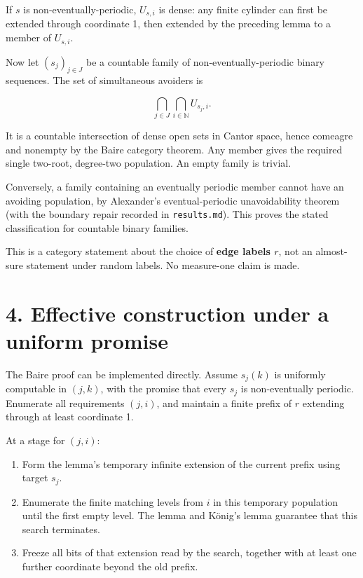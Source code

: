 \documentclass[
  11pt,
]{article}
\providecommand{\tightlist}{%
  \setlength{\itemsep}{0pt}\setlength{\parskip}{0pt}}
\begin{document}
If \(s\) is non-eventually-periodic, \(U_{s,i}\) is dense: any finite
cylinder can first be extended through coordinate 1, then extended by
the preceding lemma to a member of \(U_{s,i}\).

Now let \((s_j)_{j\in J}\) be a countable family of
non-eventually-periodic binary sequences. The set of simultaneous
avoiders is

\[\bigcap_{j\in J}\bigcap_{i\in\mathbb N}U_{s_j,i}.\]

It is a countable intersection of dense open sets in Cantor space, hence
comeagre and nonempty by the Baire category theorem. Any member gives
the required single two-root, degree-two population. An empty family is
trivial.

Conversely, a family containing an eventually periodic member cannot
have an avoiding population, by Alexander's eventual-periodic
unavoidability theorem (with the boundary repair recorded in
\texttt{results.md}). This proves the stated classification for
countable binary families.

This is a category statement about the choice of \textbf{edge labels
\(r\)}, not an almost-sure statement under random labels. No measure-one
claim is made.

\section{4. Effective construction under a uniform
promise}\label{effective-construction-under-a-uniform-promise}

The Baire proof can be implemented directly. Assume \(s_j(k)\) is
uniformly computable in \((j,k)\), with the promise that every \(s_j\)
is non-eventually periodic. Enumerate all requirements \((j,i)\), and
maintain a finite prefix of \(r\) extending through at least coordinate
1.

At a stage for \((j,i)\):

\begin{enumerate}
\def\labelenumi{\arabic{enumi}.}
\tightlist
\item
  Form the lemma's temporary infinite extension of the current prefix
  using target \(s_j\).
\item
  Enumerate the finite matching levels from \(i\) in this temporary
  population until the first empty level. The lemma and König's lemma
  guarantee that this search terminates.
\item
  Freeze all bits of that extension read by the search, together with at
  least one further coordinate beyond the old prefix.
\end{enumerate}
\end{document}
